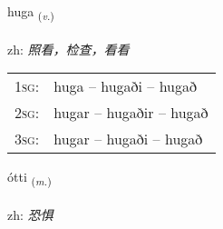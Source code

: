 \documentclass[frontgrid, backgrid]{flacards}\usepackage[]{graphicx}\usepackage[]{color}
\begin{document}
\renewcommand{\flhead}{\vskip5pt \fboxsep=0pt {\small\bfseries\footnotesize Sagnorð | 动词}}
\renewcommand{\fcfoot}{\vskip5pt \fboxsep=0pt \hspace{2pt}{\small\bfseries\footnotesize 2K}}

\renewcommand{\blhead}{\vskip5pt {\small\bfseries\footnotesize Sagnorð | 动词 }}
\renewcommand{\bcfoot}{\vskip5pt \hspace{2pt}{\small\bfseries\footnotesize 2K}}


{huga \small{\textsubscript{(\textit{v.})}} \\[1ex] %
\textphonetic{[hʏːɣa]} \\
zh: \emph{照看，检查，看看} \\  [2ex]
\renewcommand*{\arraystretch}{0.8}
\begin{tabular}{p{1cm}l}
\textsc{1sg}: & huga -- hugaði -- hugað \\ 
\textsc{2sg}: & hugar -- hugaðir -- hugað \\ 
\textsc{3sg}: & hugar -- hugaði -- hugað \\ 
\end{tabular}
}

\renewcommand{\flhead}{\vskip5pt \fboxsep=0pt {\small\bfseries\footnotesize Nafnorð | 名词}}
\renewcommand{\fcfoot}{\vskip5pt \fboxsep=0pt \hspace{2pt}{\small\bfseries\footnotesize 2K}}

\renewcommand{\blhead}{\vskip5pt {\small\bfseries\footnotesize Nafnorð | 名词 }}
\renewcommand{\bcfoot}{\vskip5pt \hspace{2pt}{\small\bfseries\footnotesize 2K}}


{ótti \small{\textsubscript{(\textit{m.})}} \\[1ex] %
\textphonetic{[ouhtɪ]} \\
zh: \emph{恐惧} \\  [2ex]
\renewcommand*{\arraystretch}{0.8}
}
\end{document}
